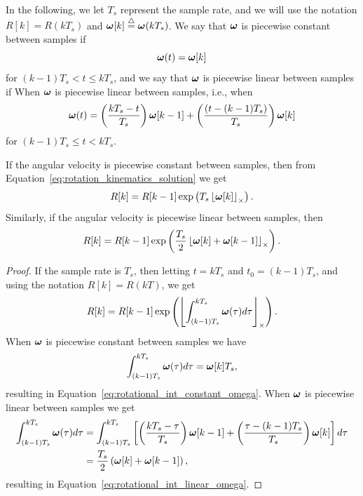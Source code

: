 In the following, we let $T_s$ represent the sample rate, and we will use the notation $R[k]=R(kT_s)$ and $\boldsymbol{\omega}[k]\stackrel{\triangle}{=}\boldsymbol{\omega}(kT_s)$.  We say that $\boldsymbol{\omega}$ is piecewise constant between samples if
\[
\boldsymbol{\omega}(t) = \boldsymbol{\omega}[k]
\]
for $(k-1)T_s < t \leq kT_s$, and we say that $\boldsymbol{\omega}$ is piecewise linear between samples if
When $\boldsymbol{\omega}$ is piecewise linear between samples, i.e., when
\[
 \boldsymbol{\omega}(t) = \left(\frac{kT_s-t}{T_s}\right)\boldsymbol{\omega}[k-1] + \left(\frac{(t-(k-1)T_s)}{T_s}\right)\boldsymbol{\omega}[k]
\]
for $(k-1)T_s \leq t < kT_s$.
\begin{lemma}
 If the angular velocity is piecewise constant between samples, then from Equation~\eqref{eq:rotation_kinematics_solution} we get
\begin{equation}\label{eq:rotational_int_constant_omega}
R[k] = R[k-1] \exp\left(T_s \ss{\omegabf[k]} \right).
\end{equation}
Similarly, if the angular velocity is piecewise linear between samples, then 
\begin{equation}\label{eq:rotational_int_linear_omega}
R[k] = R[k-1] \exp\left(\frac{T_s}{2} \ss{\omegabf[k]+\omegabf[k-1]}\right).
\end{equation}
\end{lemma}
\begin{proof}
If the sample rate is $T_s$, then letting $t=kT_s$ and $t_0=(k-1)T_s$, and using the notation $R[k]=R(kT)$, we get
\[
R[k] = R[k-1] \exp\left(\left\lfloor\int_{(k-1)T_s}^{kT_s} \boldsymbol{\omega}(\tau) d\tau \right\rfloor_{\times}\right).
\]
When $\boldsymbol{\omega}$ is piecewise constant between samples we have
\[
\int_{(k-1)T_s}^{kT_s} \boldsymbol{\omega}(\tau) d\tau = \boldsymbol{\omega}[k]T_s,
\]
resulting in Equation~\eqref{eq:rotational_int_constant_omega}.
When $\boldsymbol{\omega}$ is piecewise linear between samples we get 
\begin{align*}
\int_{(k-1)T_s}^{kT_s} \boldsymbol{\omega}(\tau) d\tau
	&= \int_{(k-1)T_s}^{kT_s} \left[\left(\frac{kT_s-\tau}{T_s}\right)\boldsymbol{\omega}[k-1] + \left(\frac{\tau-(k-1)T_s}{T_s}\right)\boldsymbol{\omega}[k]\right] d\tau \\
	&= \frac{T_s}{2} \left(\boldsymbol{\omega}[k]+\boldsymbol{\omega}[k-1]\right),
\end{align*}
resulting in Equation~\eqref{eq:rotational_int_linear_omega}.
\end{proof}

